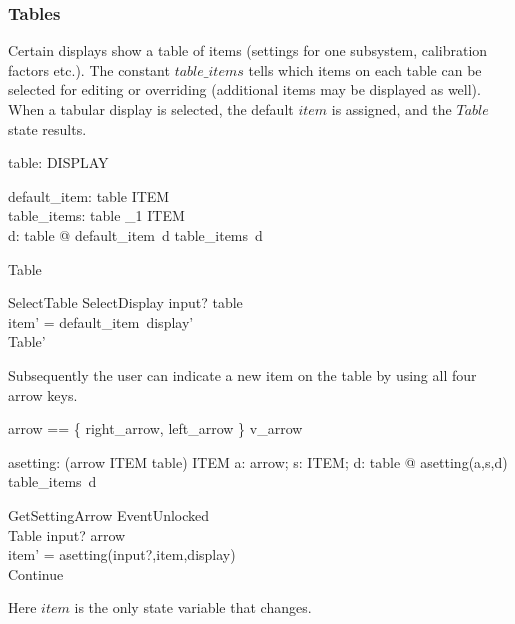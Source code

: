 \subsubsection{Tables}

Certain displays show a table of items (settings for one subsystem,
calibration factors etc.).  The constant $table\_items$ tells which
items on each table can be selected for editing or overriding
(additional items may be displayed as well).  When a tabular display
is selected, the default $item$ is assigned, and the $Table$ state
results.

\begin{axdef}
	table: \power DISPLAY
\end{axdef}

\begin{axdef}
	default\_item: table \fun ITEM \\
	table\_items: table \fun \power_1 ITEM \\
\where 
	\forall d: table @ default\_item~d \in table\_items~d
\end{axdef}


\begin{zed}
Table 
\end{zed}

\begin{schema}{SelectTable}
	SelectDisplay
\where
	input? \in table \\
	item' = default\_item~display' \\
	Table'
\end{schema}
Subsequently the user can indicate a new item on the table by using
all four arrow keys.

\begin{zed} arrow == \{ right\_arrow, left\_arrow \} \cup v\_arrow \end{zed}

\begin{axdef}
	asetting: (arrow \cross ITEM \cross table) \fun ITEM
\where
	\forall a: arrow; s: ITEM; d: table @ asetting(a,s,d) \in table\_items~d
\end{axdef}

\begin{schema}{GetSettingArrow}
	EventUnlocked \\
	\Delta Table
\where
	input? \in arrow \\
	item' = asetting(input?,item,display) \\
	Continue
\end{schema}
Here $item$ is the only state variable that changes.

